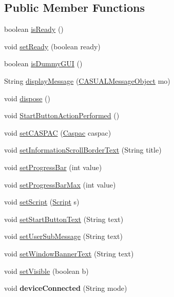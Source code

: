 \subsection*{Public Member Functions}
\begin{DoxyCompactItemize}
\item 
boolean \hyperlink{class_g_u_i_1_1testing_1_1automatic_a41748074b34eaf3ff1ddbb26c1bb2a11}{is\-Ready} ()
\item 
void \hyperlink{class_g_u_i_1_1testing_1_1automatic_a8220235441649228563095be44a50df1}{set\-Ready} (boolean ready)
\item 
boolean \hyperlink{class_g_u_i_1_1testing_1_1automatic_a689ead94a0fad075c1603493ce5f9a6c}{is\-Dummy\-G\-U\-I} ()
\item 
String \hyperlink{class_g_u_i_1_1testing_1_1automatic_a16f4a2dba0f1489a32e9c9b44036ddfd}{display\-Message} (\hyperlink{class_c_a_s_u_a_l_1_1_c_a_s_u_a_l_message_object}{C\-A\-S\-U\-A\-L\-Message\-Object} mo)
\item 
void \hyperlink{class_g_u_i_1_1testing_1_1automatic_ac3b48ee2fcb52574b33672869181a490}{dispose} ()
\item 
void \hyperlink{class_g_u_i_1_1testing_1_1automatic_a0f58e60a5432386ad0b1f8e26f64caf8}{Start\-Button\-Action\-Performed} ()
\item 
void \hyperlink{class_g_u_i_1_1testing_1_1automatic_a3a63f1f27a7070c4031eeb75049ab728}{set\-C\-A\-S\-P\-A\-C} (\hyperlink{class_c_a_s_u_a_l_1_1caspac_1_1_caspac}{Caspac} caspac)
\item 
void \hyperlink{class_g_u_i_1_1testing_1_1automatic_aeaac7118acdd913053a9331f406d9d1b}{set\-Information\-Scroll\-Border\-Text} (String title)
\item 
void \hyperlink{class_g_u_i_1_1testing_1_1automatic_a61eac590affebef093d851ab667cf8f6}{set\-Progress\-Bar} (int value)
\item 
void \hyperlink{class_g_u_i_1_1testing_1_1automatic_a80edc9880e888db4c798bc7a83790085}{set\-Progress\-Bar\-Max} (int value)
\item 
void \hyperlink{class_g_u_i_1_1testing_1_1automatic_a58cfb6e02a4bbbdca3a15d34314f6011}{set\-Script} (\hyperlink{class_c_a_s_u_a_l_1_1caspac_1_1_script}{Script} s)
\item 
void \hyperlink{class_g_u_i_1_1testing_1_1automatic_aa47b7603ba59eb1e2d9583855e08924c}{set\-Start\-Button\-Text} (String text)
\item 
void \hyperlink{class_g_u_i_1_1testing_1_1automatic_ab5eee899b75ef6932666f8364056b3c0}{set\-User\-Sub\-Message} (String text)
\item 
void \hyperlink{class_g_u_i_1_1testing_1_1automatic_a6827a03d1a8243832ebb4787ab798792}{set\-Window\-Banner\-Text} (String text)
\item 
void \hyperlink{class_g_u_i_1_1testing_1_1automatic_aabce92c87447ab9d07e1407b2212e38b}{set\-Visible} (boolean b)
\item 
\hypertarget{class_g_u_i_1_1testing_1_1automatic_ad1ce66c1fbf356eb227a037028f34156}{void {\bfseries device\-Connected} (String mode)}\label{class_g_u_i_1_1testing_1_1automatic_ad1ce66c1fbf356eb227a037028f34156}


\end{DoxyCompactItemize}
